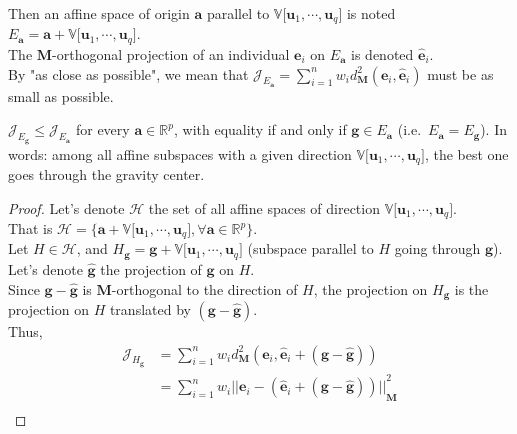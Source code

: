 \begin{notechapter}
Then an affine space of origin $\textbf{a}$ parallel to $\mathbb{V}\big[\textbf{u}_1, \cdots, \textbf{u}_{q}\big]$ is noted 
$E_{\textbf{a}} = \textbf{a} + \mathbb{V}\big[\textbf{u}_1, \cdots, \textbf{u}_{q}\big]$.\\[6pt]
The $\textbf{M}$-orthogonal projection of an individual $\textbf{e}_i$ on $E_{\textbf{a}}$ is denoted $\hat{\textbf{e}}_i$.\\[6pt]
By "as close as possible", we mean that 
$\mathcal{J}_{E_{\textbf{a}}} =  \displaystyle\sum_{i=1}^{n} w_{i}d_{\mathbf{M}}^2(\textbf{e}_i, \hat{\textbf{e}}_i)$
must be as small as possible.\\[6pt]
\begin{prop}
    $\mathcal{J}_{E_{\textbf{g}}} \leq \mathcal{J}_{E_{\textbf{a}}}$ for every $\textbf{a} \in \mathbb{R}^p$, with equality if and only if $\textbf{g} \in E_{\textbf{a}}$ (i.e.\ $E_{\textbf{a}} = E_{\textbf{g}}$).
    In words: among all affine subspaces with a given direction $\mathbb{V}\big[\textbf{u}_1, \cdots, \textbf{u}_{q}\big]$, the best one goes through the gravity center.
\end{prop}
\begin{proof}
    Let's denote $\mathcal{H}$ the set of all affine spaces of direction $\mathbb{V}\big[\textbf{u}_1, \cdots, \textbf{u}_{q}\big]$.\\[6pt]
    That is $\mathcal{H} = \big\{ \textbf{a} + \mathbb{V}\big[\textbf{u}_1, \cdots, \textbf{u}_{q}\big], \forall \textbf{a} \in \mathbb{R}^{p} \big\}$.\\[6pt]
    Let $H \in \mathcal{H}$, and  $H_{\textbf{g}} = \textbf{g} + \mathbb{V}\big[\textbf{u}_1, \cdots, \textbf{u}_{q}\big]$ 
    (subspace parallel to $H$ going through $\textbf{g}$).\\[6pt]
    Let's denote $\hat{\textbf{g}}$ the projection of $\textbf{g}$ on $H$.\\[6pt]
    Since $\textbf{g} - \hat{\textbf{g}}$ is $\textbf{M}$-orthogonal to the direction of $H$, the projection on $H_{\textbf{g}}$ is the projection on $H$ translated by $(\textbf{g} - \hat{\textbf{g}})$.\\[5pt]
    Thus,
    \begin{align*}
        \mathcal{J}_{H_{\textbf{g}}} &=
        \displaystyle\sum_{i=1}^{n} w_{i}d_{\mathbf{M}}^2(\textbf{e}_i, \hat{\textbf{e}}_i + (\textbf{g} - \hat{\textbf{g}}))\\
        &=
        \displaystyle\sum_{i=1}^{n} w_{i} \big| \big| {\textbf{e}_i - (\hat{\textbf{e}}_i + (\textbf{g} - \hat{\textbf{g}})) \big| \big|}_{\mathbf{M}}^2\\

\end{align*}
\end{proof}
\end{notechapter}
